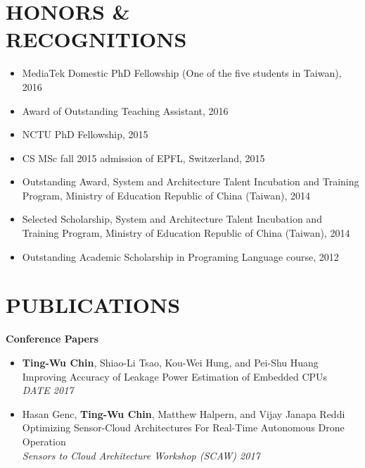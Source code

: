 \documentclass[margin, 9pt]{res} %
\begin{document}
\begin{resume}
\section{HONORS \&\\ RECOGNITIONS}

\vspace*{-1pt}
\begin{itemize}[leftmargin=*] \itemsep -4pt
  \item MediaTek Domestic PhD Fellowship (One of the five students in Taiwan), 2016
  \item Award of Outstanding Teaching Assistant, 2016
	\item NCTU PhD Fellowship, 2015
	\item CS MSc fall 2015 admission of EPFL, Switzerland, 2015
	\item Outstanding Award, System and Architecture Talent Incubation and
  Training Program, Ministry of Education Republic of China (Taiwan), 2014
	\item Selected Scholarship, System and Architecture Talent Incubation and
  Training Program, Ministry of Education Republic of China (Taiwan), 2014
	\item Outstanding Academic Scholarship in Programing Language course, 2012
\end{itemize}


\section{PUBLICATIONS}

{\large\textbf{Conference Papers}}

\begin{itemize}[leftmargin=*] \itemsep 0pt
	\item \textbf{Ting-Wu Chin}, Shiao-Li Tsao, Kou-Wei Hung, and Pei-Shu Huang\\[2pt]
          Improving Accuracy of Leakage Power Estimation of Embedded CPUs\\
          \textit{DATE 2017}
	\item Hasan Genc, \textbf{Ting-Wu Chin}, Matthew Halpern, and Vijay Janapa Reddi\\[2pt]
          Optimizing Sensor-Cloud Architectures For Real-Time Autonomous Drone Operation\\
          \textit{Sensors to Cloud Architecture Workshop (SCAW) 2017}
\end{itemize}


\end{resume}
\end{document}
